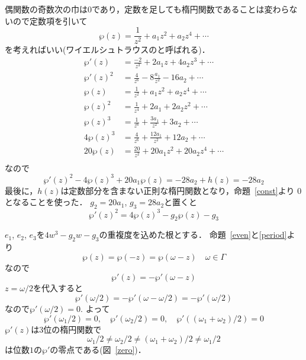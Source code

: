 偶関数の奇数次の巾は$0$であり，定数を足しても楕円関数であることは変わらないので定数項を引いて
\begin{equation}\label{wp}
	\wp(z)
	=
	 \frac{1}{z^2}
	+ a_1z^2 + a_2z^4 + \cdots 
\end{equation}
を考えればいい(ワイエルシュトラウスのと呼ばれる)．
\[
\begin{split}
	\wp'(z)
	&=
	 \frac{-2}{z^3}
	+ 2a_1z + 4a_2z^3 + \cdots \\
	\wp'(z)^2
	&=
	\frac{4}{z^6}-8\frac{a_1}{z^2}-16a_2+\cdots \\
	\wp(z)
	&=
	 \frac{1}{z^2}
	+ a_1z^2 + a_2z^4 + \cdots \\
	\wp(z)^2
	&=
	 \frac{1}{z^4}
	+ 2a_1 + 2a_2z^2 + \cdots \\
	\wp(z)^3
	&=
	 \frac{1}{z^6}
	+ \frac{3a_1}{z^2} + 3a_2 + \cdots \\
	4\wp(z)^3
	&=
	 \frac{4}{z^6}
	+ \frac{12a_1}{z^2} + 12a_2 + \cdots \\
	20\wp(z)
	&=
	 \frac{20}{z^2}
	+ 20a_1z^2 + 20a_2z^4 + \cdots \\
\end{split}
\]
なので
\[
	\wp'(z)^2-4\wp(z)^3+20a_1\wp(z)
	=-28a_2 + h(z)
	=-28a_2
\]
最後に，$h(z)$は定数部分を含まない正則な楕円関数となり，命題~\ref{const}より $0$となることを使った．
$g_2=20a_1$, $g_3=28a_2$と置くと
\begin{equation}\label{dEqWp}
	\wp'(z)^2=4\wp(z)^3-g_2 \wp(z)-g_3
\end{equation}

$e_1$, $e_2$, $e_3$を$4w^3-g_2 w-g_3$の重複度を込めた根とする．
命題~\ref{even}と\eqref{period}より
\[
	\wp(z)=\wp(-z)=\wp(\omega -z)\quad \omega\in\Gamma
\]
なので
\[
	\wp'(z)=-\wp'(\omega -z)
\]
$z=\omega/2$を代入すると
\[
	\wp'(\omega/2)=-\wp'(\omega -\omega/2)=-\wp'(\omega/2)
\]
なので$\wp'(\omega/2)=0$. よって
\begin{equation}\label{zeroWp'}
	\wp'(\omega_1/2)=0,\quad
	\wp'(\omega_2/2)=0,\quad
	\wp'((\omega_1+\omega_2)/2)=0
\end{equation}
$\wp'(z)$は3位の楕円関数で
\[
	\omega_1/2\neq \omega_2/2
	\neq (\omega_1+\omega_2)/2\neq\omega_1/2
\]
は位数$1$の$\wp'$の零点である(図~\ref{zero})．

